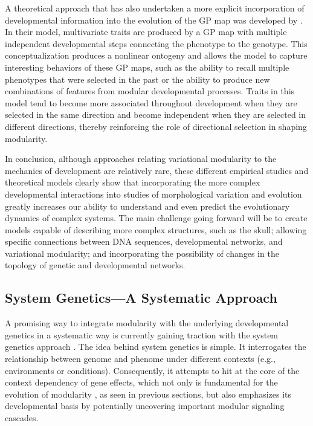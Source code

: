 \begin{refsection}
A theoretical approach that has also undertaken a more explicit
incorporation of developmental information into the evolution of the GP
map was developed by \textcite{Watson2014-pi}. In their model, multivariate traits are produced by a GP map
with multiple independent developmental steps connecting the phenotype
to the genotype. This conceptualization produces a nonlinear ontogeny
and allows the model to capture interesting behaviors of these GP maps,
such as the ability to recall multiple phenotypes that were selected in
the past or the ability to produce new combinations of features from
modular developmental processes. Traits in this model tend to become
more associated throughout development when they are selected in the
same direction and become independent when they are selected in
different directions, thereby reinforcing the role of directional
selection in shaping modularity.

\enlargethispage{\baselineskip}
In conclusion, although approaches relating variational modularity to
the mechanics of development are relatively rare, these different
empirical studies and theoretical models clearly show that incorporating
the more complex developmental interactions into studies of
morphological variation and evolution greatly increases our ability to
understand and even predict the evolutionary dynamics of complex
systems. The main challenge going forward will be to create models
capable of describing more complex structures, such as the skull;
allowing specific connections between DNA sequences, developmental
networks, and variational modularity; and incorporating the possibility
of changes in the topology of genetic and developmental networks.

\subsection{System Genetics---A Systematic Approach}

A promising way to integrate modularity with the underlying
developmental genetics in a systematic way is currently gaining traction
with the system genetics approach \parencite{Ayroles2009-ld, Mackay2009-fo}. 
The idea behind
system genetics is simple. It interrogates the relationship between
genome and phenome under different contexts (e.g., environments or
conditions). Consequently, it attempts to hit at the core of the context
dependency of gene effects, which not only is fundamental for the
evolution of modularity \parencite{Pavlicev2015-up}, as seen in previous sections, but also emphasizes its
developmental basis by potentially uncovering important modular
signaling cascades.


\end{refsection}

